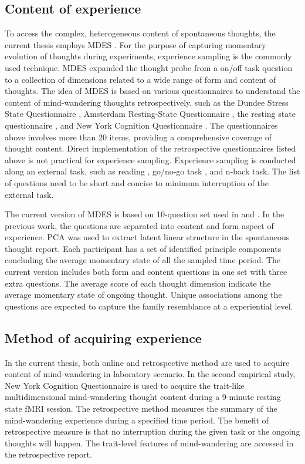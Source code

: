 \subsection{Content of experience}

To access the complex, heterogeneous content of spontaneous thoughts, the current thesis employs MDES \cite{Medea2016, RubyPlos2013, Smallwood2016}. For the purpose of capturing momentary evolution of thoughts during experiments, experience sampling \cite{Kahneman2004} is the commonly used technique. MDES expanded the thought probe from a on/off task question to a collection of dimensions related to a wide range of form and content of thoughts. The idea of MDES is based on various questionnaires to understand the content of mind-wandering thoughts retrospectively, such as the Dundee Stress State Questionnaire \cite{Matthews1999}, Amsterdam Resting-State Questionnaire \cite{Diaz2013}, the resting state questionnaire \cite{Delamillieure2010}, and New York Cognition Questionnaire \cite{Gorgolewski2014}. The questionnaires above involves more than 20 items, providing a comprehensive coverage of thought content. Direct implementation of the retrospective questionnaires listed above is not practical for experience sampling. Experience sampling is conducted along an external task, such as reading \cite{Franklin2011}, go/no-go task \cite{Christoff2009}, and n-back task\cite{Kane2007}. The list of questions need to be short and concise to minimum interruption of the external task. 

The current version of MDES is based on 10-question set used in \cite{Medea2016} and . In the previous work, the questions are separated into content and form aspect of experience. PCA was used to extract latent linear structure in the spontaneous thought report. Each participant has a set of identified principle components concluding the average momentary state of all the sampled time period. The current version includes both form and content questions in one set with three extra questions. The average score of each thought dimension indicate the average momentary state of ongoing thought. Unique associations among the questions are expected to capture the family resemblance at a experiential level. 

\subsection{Method of acquiring experience}

In the current thesis, both online and retrospective method are used to acquire content of mind-wandering in laboratory scenario. In the second empirical study, New York Cognition Questionnaire \cite{Gorgolewski2014} is used to acquire the trait-like multidimensional mind-wandering thought content during a 9-minute resting state fMRI session. The retrospective method measures the summary of the mind-wandering experience during a specified time period. The benefit of retrospective measure is that no interruption during the given task or the ongoing thoughts will happen. The trait-level features of mind-wandering are accessed in the retrospective report. 

